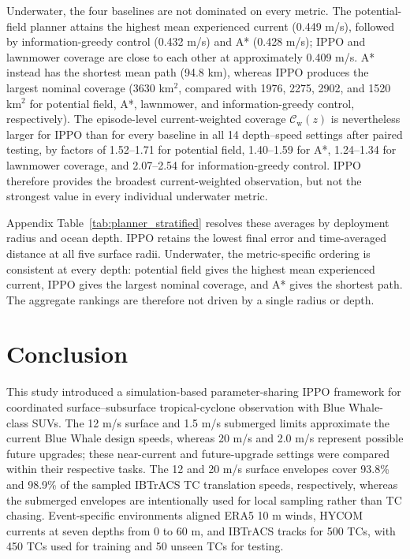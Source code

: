 \documentclass[a4paper,fleqn]{cas-dc}
\begin{document}
Underwater, the four baselines are not dominated on every metric. The
potential-field planner attains the highest mean experienced current
(0.449 m/s), followed by information-greedy control (0.432 m/s) and A*
(0.428 m/s); IPPO and lawnmower coverage are close to each other at
approximately 0.409 m/s. A* instead has the shortest mean path (94.8 km),
whereas IPPO produces the largest nominal coverage (3630 km\(^2\), compared
with 1976, 2275, 2902, and 1520 km\(^2\) for potential field, A*, lawnmower,
and information-greedy control, respectively). The episode-level
current-weighted coverage \(\mathcal C_{\mathrm w}(z)\) is nevertheless larger
for IPPO than for every baseline in all 14 depth--speed settings after paired
testing, by factors of 1.52--1.71 for potential field, 1.40--1.59 for A*,
1.24--1.34 for lawnmower coverage, and 2.07--2.54 for information-greedy
control. IPPO therefore provides the broadest current-weighted observation,
but not the strongest value in every individual underwater metric.

Appendix Table~\ref{tab:planner_stratified} resolves these averages by
deployment radius and ocean depth. IPPO retains the lowest final error and
time-averaged distance at all five surface radii. Underwater, the
metric-specific ordering is consistent at every depth: potential field gives
the highest mean experienced current, IPPO gives the largest nominal coverage,
and A* gives the shortest path. The aggregate rankings are therefore not driven
by a single radius or depth.

\section{Conclusion}

This study introduced a simulation-based parameter-sharing IPPO framework for
coordinated surface--subsurface tropical-cyclone observation with Blue
Whale-class SUVs. The 12 m/s surface and 1.5 m/s submerged limits approximate
the current Blue Whale design speeds, whereas 20 m/s and 2.0 m/s represent
possible future upgrades; these near-current and future-upgrade settings were
compared within their respective tasks. The 12 and 20 m/s surface envelopes
cover 93.8\% and 98.9\% of the sampled IBTrACS TC translation speeds,
respectively, whereas the submerged envelopes are intentionally used for local
sampling rather than TC chasing. Event-specific environments aligned
ERA5 10 m winds, HYCOM currents at seven depths from 0 to 60 m, and IBTrACS
tracks for 500 TCs, with 450 TCs used for training and 50 unseen TCs for
testing.
\end{document}

